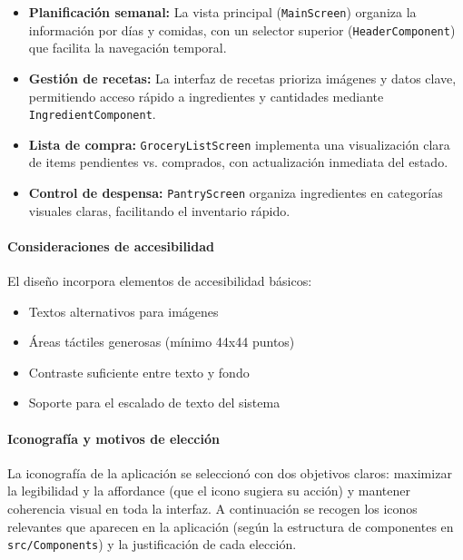 \documentclass[twoside, openright, 11pt]{report}
\begin{document}
					\begin{itemize}
						\item \textbf{Planificación semanal:} La vista principal (\texttt{MainScreen}) organiza la información por días y comidas, con un selector superior (\texttt{HeaderComponent}) que facilita la navegación temporal.
						
						\item \textbf{Gestión de recetas:} La interfaz de recetas prioriza imágenes y datos clave, permitiendo acceso rápido a ingredientes y cantidades mediante \texttt{IngredientComponent}.
						
						\item \textbf{Lista de compra:} \texttt{GroceryListScreen} implementa una visualización clara de items pendientes vs. comprados, con actualización inmediata del estado.
						
						\item \textbf{Control de despensa:} \texttt{PantryScreen} organiza ingredientes en categorías visuales claras, facilitando el inventario rápido.
					\end{itemize}
				
				\paragraph*{Consideraciones de accesibilidad}
					El diseño incorpora elementos de accesibilidad básicos:
					
					\begin{itemize}
						\item Textos alternativos para imágenes
						\item Áreas táctiles generosas (mínimo 44x44 puntos)
						\item Contraste suficiente entre texto y fondo
						\item Soporte para el escalado de texto del sistema
					\end{itemize}
				
				\paragraph{Iconografía y motivos de elección}
					La iconografía de la aplicación se seleccionó con dos objetivos claros: maximizar la legibilidad y la affordance (que el icono sugiera su acción) y mantener coherencia visual en toda la interfaz. A continuación se recogen los iconos relevantes que aparecen en la aplicación (según la estructura de componentes en \texttt{src/Components}) y la justificación de cada elección.
				
\end{document}
